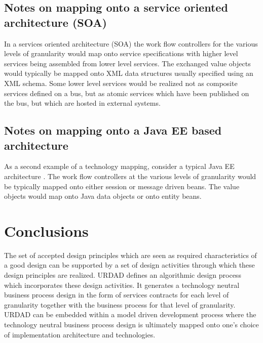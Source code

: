 \documentclass{IOS-Book-Article}
\begin{document}

\subsection{Notes on mapping onto a service oriented architecture (SOA)}

In a services oriented architecture (SOA) \cite{erl:soa}
the work flow controllers for the various levels of granularity would map onto service specifications with 
higher level services being assembled from lower level services. The exchanged value objects would typically be
mapped onto  XML data structures usually specified using an XML schema. Some lower level services would be
realized not as composite services defined on a bus, but as atomic services which have been published on the
bus, but which are hosted in external systems.


\subsection{Notes on mapping onto a Java EE based architecture}

As a second example of a technology mapping, consider a typical Java EE architecture \cite{sun:javaee}.
The work flow controllers at the various levels of granularity would be typically mapped onto either session
or message driven beans. The value objects would map onto Java data objects or onto entity beans.


\section{Conclusions}

The set of accepted design principles which are seen as required characteristics of a good design can
be supported by a set of design activities through which these design principles are realized. URDAD
defines an algorithmic design process which incorporates these design activities. It generates a
technology neutral business process design in the form of  services contracts for each level of granularity
together with the business process for that level of granularity. URDAD can be embedded within a
model driven development process where the technology neutral business process design is
ultimately mapped onto one's choice of implementation architecture and technologies.
\end{document}
